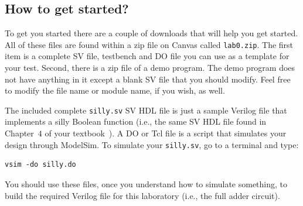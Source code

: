 \documentclass{article}
\begin{document}
\subsection{How to get started?}

To get you started there are a couple of downloads that will help you
get started.  All of these files are found within a zip file on Canvas
called \verb!lab0.zip!.
The first item is a complete SV file, testbench and DO
file you can use as a template for your test.  
Second, there is a zip
file of a demo program.  The demo program does not have anything in it
except a blank SV file that you should modify.  Feel free to modify
the file name or module name, if you wish, as well.

The included complete \verb!silly.sv! SV HDL file
is just a sample Verilog file that
implements a silly Boolean function (i.e., the same SV HDL file
found in Chapter~$4$ of your
textbook~\cite{ddca-riscv}).  A DO or Tcl file is a script
that simulates your design through ModelSim.
To simulate your \verb!silly.sv!,
go to a terminal and type:
\begin{verbatim}
vsim -do silly.do 
\end{verbatim}
You should use these
files, once you understand how to simulate something, to build the
required Verilog file for this laboratory (i.e., the full adder
circuit).
\end{document}
